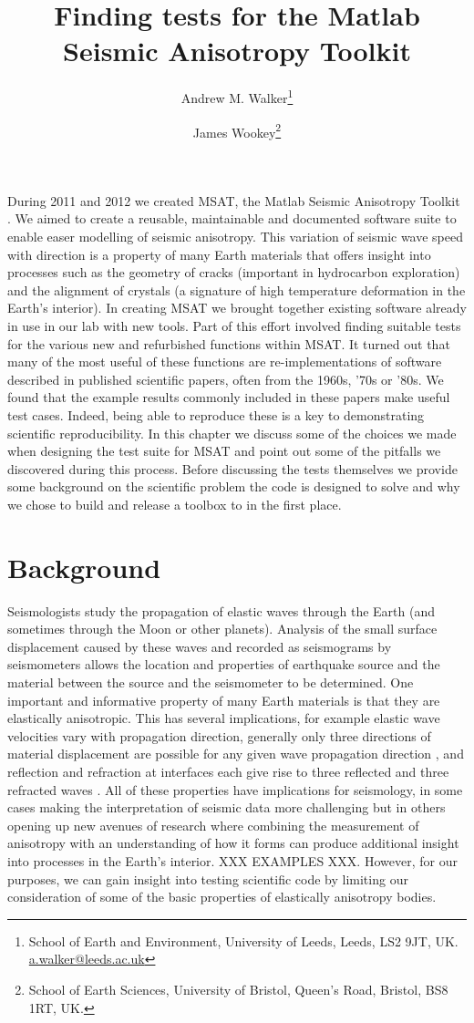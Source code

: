 \documentclass[11pt, oneside]{article}   	%
\title{Finding tests for the Matlab Seismic Anisotropy Toolkit}
\author{Andrew M. Walker\footnote{School of Earth and Environment, 
                   University of Leeds, Leeds, LS2 9JT, UK. \url{a.walker@leeds.ac.uk} }
\and 
             James Wookey\footnote{School of Earth Sciences, 
                    University of Bristol, Queen's Road, Bristol, BS8 1RT, UK.}}
\begin{document}
\maketitle
\linenumbers


During 2011 and 2012 we created MSAT, the Matlab Seismic Anisotropy
Toolkit \cite{Walker2012c}. We aimed to create a reusable, maintainable and documented
software suite to enable easer modelling of seismic anisotropy. This 
variation of seismic wave speed with direction is a property of many 
Earth materials that offers insight into processes such as the geometry
of cracks (important in hydrocarbon exploration) and the alignment
of crystals (a signature of high temperature deformation in the Earth's
interior). In creating MSAT we brought together existing software
already in use in our lab with new tools. Part of this effort involved
finding suitable tests for the various new and refurbished functions 
within MSAT. It turned out that many of the most useful of these 
functions are re-implementations of software described in published
scientific papers, often from the 1960s, '70s or '80s. We found that 
the example results commonly included in these papers make useful test
cases. Indeed, being able to reproduce these is a key to demonstrating 
scientific reproducibility. In this chapter we discuss some of the choices
we made when designing the test suite for MSAT and point out some of
the pitfalls we discovered during this process. Before discussing the 
tests themselves we provide some background on the scientific problem
the code is designed to solve and why we chose to build and release a 
toolbox to in the first place.

\section{Background}

Seismologists study the propagation of elastic waves through the Earth (and
sometimes through the Moon or other planets). Analysis of the small surface 
displacement caused by these waves and recorded as seismograms by 
seismometers allows the location and properties of earthquake source 
and the material between the source and the seismometer to be determined.
One important and informative property of many Earth materials is that they 
are elastically anisotropic. This has several implications, for example elastic 
wave velocities vary with propagation direction, generally only three directions 
of material displacement are possible for any given wave propagation direction
\cite{Mainprice2007}, and reflection and refraction at interfaces each give
rise to three reflected and three refracted waves \cite{Musgrave1960}. All of these
properties have implications for seismology, in some cases making the interpretation
of seismic data more challenging but in others opening up new avenues of research
where combining the measurement of anisotropy with an understanding of how
it forms can produce additional insight into processes in the Earth's interior. 
XXX EXAMPLES XXX. However, for our purposes, we can gain insight into 
testing scientific code by limiting our consideration of some of the basic properties
of elastically anisotropy bodies.
\end{document}
